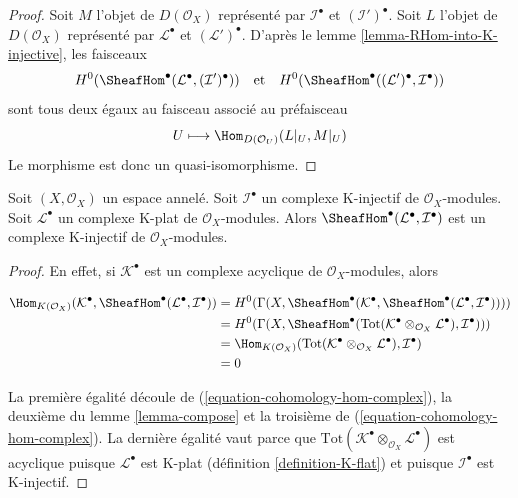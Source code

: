 {\begin{proof}
Soit $M$ l'objet de $D(\mathcal{O}_X)$ représenté par $\mathcal{I}^\bullet$ et $(\mathcal{I}')^\bullet$. Soit $L$ l'objet de $D(\mathcal{O}_X)$ représenté par $\mathcal{L}^\bullet$ et $(\mathcal{L}')^\bullet$. D'après le lemme \ref{lemma-RHom-into-K-injective}, les faisceaux $$
H^0(\SheafHom^\bullet(\mathcal{L}^\bullet, (\mathcal{I}')^\bullet))
\quad\text{et}\quad
H^0(\SheafHom^\bullet((\mathcal{L}')^\bullet, \mathcal{I}^\bullet))
$$ sont tous deux égaux au faisceau associé au préfaisceau $$
U \longmapsto \Hom_{D(\mathcal{O}_U)}(L|_U, M|_U)
$$ Le morphisme est donc un quasi-isomorphisme.
\end{proof}

\begin{lemma}

\label{lemma-RHom-from-K-flat-into-K-injective}
Soit $(X, \mathcal{O}_X)$ un espace annelé. Soit $\mathcal{I}^\bullet$ un complexe K-injectif de $\mathcal{O}_X$-modules. Soit $\mathcal{L}^\bullet$ un complexe K-plat de $\mathcal{O}_X$-modules. Alors $\SheafHom^\bullet(\mathcal{L}^\bullet, \mathcal{I}^\bullet)$ est un complexe K-injectif de $\mathcal{O}_X$-modules.
\end{lemma}

\begin{proof}

En effet, si $\mathcal{K}^\bullet$ est un complexe acyclique de
$\mathcal{O}_X$-modules, alors

\begin{align*}
\Hom_{K(\mathcal{O}_X)}(\mathcal{K}^\bullet,
\SheafHom^\bullet(\mathcal{L}^\bullet, \mathcal{I}^\bullet))
& =
H^0(\Gamma(X,
\SheafHom^\bullet(\mathcal{K}^\bullet,
\SheafHom^\bullet(\mathcal{L}^\bullet, \mathcal{I}^\bullet)))) \\
& =
H^0(\Gamma(X, \SheafHom^\bullet(\text{Tot}(
\mathcal{K}^\bullet \otimes_{\mathcal{O}_X} \mathcal{L}^\bullet),
\mathcal{I}^\bullet))) \\
& =
\Hom_{K(\mathcal{O}_X)}(
\text{Tot}(\mathcal{K}^\bullet \otimes_{\mathcal{O}_X} \mathcal{L}^\bullet),
\mathcal{I}^\bullet) \\
& =
0
\end{align*}

La première égalité découle de (\ref{equation-cohomology-hom-complex}), la deuxième du lemme \ref{lemma-compose} et la troisième de (\ref{equation-cohomology-hom-complex}). La dernière égalité vaut parce que
$\text{Tot}(\mathcal{K}^\bullet \otimes_{\mathcal{O}_X} \mathcal{L}^\bullet)$
est acyclique puisque $\mathcal{L}^\bullet$ est K-plat (définition \ref{definition-K-flat}) et puisque $\mathcal{I}^\bullet$
est K-injectif.


\end{proof}}
